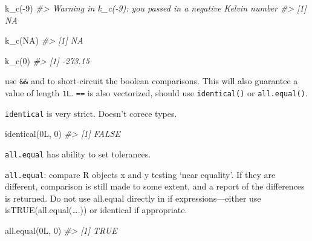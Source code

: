 \documentclass[
]{book}
\newenvironment{Shaded}{\begin{snugshade}}{\end{snugshade}}
\newcommand{\CommentTok}[1]{\textcolor[rgb]{0.56,0.35,0.01}{\textit{#1}}}
\newcommand{\ConstantTok}[1]{\textcolor[rgb]{0.00,0.00,0.00}{#1}}
\newcommand{\DecValTok}[1]{\textcolor[rgb]{0.00,0.00,0.81}{#1}}
\newcommand{\FunctionTok}[1]{\textcolor[rgb]{0.00,0.00,0.00}{#1}}
\newcommand{\NormalTok}[1]{#1}
\newcommand{\SpecialCharTok}[1]{\textcolor[rgb]{0.00,0.00,0.00}{#1}}
\begin{document}
\begin{Shaded}
\begin{Highlighting}[]
\FunctionTok{k\_c}\NormalTok{(}\SpecialCharTok{{-}}\DecValTok{9}\NormalTok{)}
\CommentTok{\#\textgreater{} Warning in k\_c({-}9): you passed in a negative Kelvin number}
\CommentTok{\#\textgreater{} [1] NA}
\end{Highlighting}
\end{Shaded}

\begin{Shaded}
\begin{Highlighting}[]
\FunctionTok{k\_c}\NormalTok{(}\ConstantTok{NA}\NormalTok{)}
\CommentTok{\#\textgreater{} [1] NA}
\end{Highlighting}
\end{Shaded}

\begin{Shaded}
\begin{Highlighting}[]
\FunctionTok{k\_c}\NormalTok{(}\DecValTok{0}\NormalTok{)}
\CommentTok{\#\textgreater{} [1] {-}273.15}
\end{Highlighting}
\end{Shaded}

use \texttt{\&\&} and \texttt{\textbar{}\textbar{}} to short-circuit the boolean comparisons.
This will also guarantee a value of length \texttt{1L}.
\texttt{==} is also vectorized, should use \texttt{identical()} or \texttt{all.equal()}.

\texttt{identical} is very strict. Doesn't corece types.

\begin{Shaded}
\begin{Highlighting}[]
\FunctionTok{identical}\NormalTok{(0L, }\DecValTok{0}\NormalTok{)}
\CommentTok{\#\textgreater{} [1] FALSE}
\end{Highlighting}
\end{Shaded}

\texttt{all.equal} has ability to set tolerances.

\texttt{all.equal}: compare R objects x and y testing `near equality'. If they are different, comparison is still made to some extent, and a report of the differences is returned. Do not use all.equal directly in if expressions---either use isTRUE(all.equal(\ldots.)) or identical if appropriate.

\begin{Shaded}
\begin{Highlighting}[]
\FunctionTok{all.equal}\NormalTok{(0L, }\DecValTok{0}\NormalTok{)}
\CommentTok{\#\textgreater{} [1] TRUE}
\end{Highlighting}
\end{Shaded}
\end{document}
